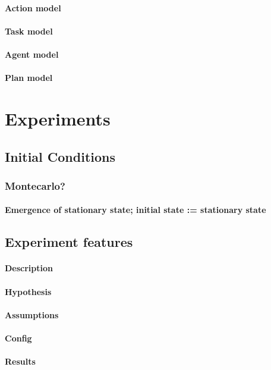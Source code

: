 \documentclass{report}
\begin{document}
				\paragraph{Action model}
				\paragraph{Task model}
				\paragraph{Agent model}
				\paragraph{Plan model}
	\section{Experiments}
		\subsection{Initial Conditions}
			\subsubsection{Montecarlo?} 
			\paragraph{Emergence of stationary state; initial state := stationary state}
		\subsection{Experiment features}
			\paragraph{Description}
			\paragraph{Hypothesis}
			\paragraph{Assumptions}
			\paragraph{Config}
			\paragraph{Results}
\end{document}
